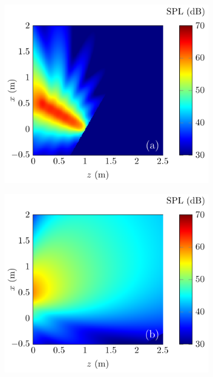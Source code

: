 \begin{figure}[!htb]
    \centering
    \begin{subfigure}{0.35\textwidth}
        \centering
        \includegraphics[width = \textwidth]{fig/ComputePalReflectionTruncated_Ultra60000Hz_ByIncidentUltra_211013J.pdf}
    \end{subfigure}
    \begin{subfigure}{0.35\textwidth}
        \centering
        \includegraphics[width = \textwidth]{fig/ComputePalReflectionTruncated_Ultra60000Hz_ByIncidentUltraReflection_211013K.pdf}

\end{subfigure}
\end{figure}

